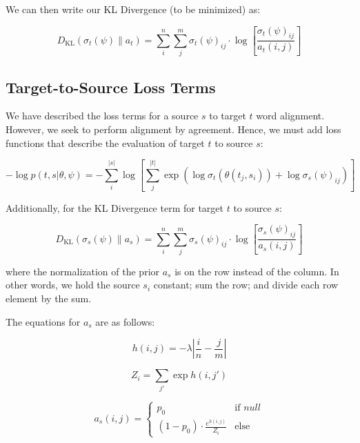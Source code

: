 \documentclass[twoside,twocolumn]{article}
\newlength\mystoreparindent
\newenvironment{myparindent}[1]{%
  \setlength{\mystoreparindent}{\the\parindent}
  \setlength{\parindent}{#1}
  }{%
  \setlength{\parindent}{\mystoreparindent}
}
\begin{document}
\begin{myparindent}{0pt}
We can then write our KL Divergence (to be minimized) as:

\begin{equation}
  D_{\mathrm{KL}}(\sigma_t(\psi) \| a_t) =
    \sum_i^n \sum_j^m \sigma_t(\psi)_{ij} \cdot
      \log \left[ \frac{\sigma_t(\psi)_{ij}}{a_t(i, j)} \right]
\end{equation}


\subsection{Target-to-Source Loss Terms}

We have described the loss terms for a source $s$ to target $t$ word alignment.
However, we seek to perform alignment by agreement. Hence, we must add loss
functions that describe the evaluation of target $t$ to source $s$:

\begin{equation}
  -\log  p(t , s | \theta, \psi) =
  - \sum_i^{|s|}  \log \left[ \sum_j^{|t|}
      \exp \left(
        \log \sigma_t(\theta(t_j, s_i)) + \log \sigma_s(\psi)_{ij}
      \right)
    \right]
\end{equation}

\noindent
Additionally, for the KL Divergence term for target $t$ to source $s$:

\begin{equation}
D_{\mathrm{KL}} (\sigma_s(\psi) \| a_s) = \sum_i^n \sum_j^m \sigma_s(\psi)_{ij}
  \cdot \log \left[ \frac{\sigma_s(\psi)_{ij}}{a_s(i, j)} \right]
\end{equation}

\noindent
where the normalization of the prior $a_s$ is on the row instead of the column.
In other words, we hold the source $s_i$ constant; sum the row; and divide each
row element by the sum.

The equations for $a_s$ are as follows:

\begin{equation}
  h(i, j) = {-\lambda \left| \frac{i}{n} - \frac{j}{m}\right|}
\end{equation}

\begin{equation}
  Z_i = \sum_{j'} \exp h(i, j')
\end{equation}

\begin{equation}
a_s (i, j) =
\begin{cases}
      p_0 & \text{if } null \\
     (1-p_0) \cdot \frac{e^{h(i,j)}}{Z_i} & \text{else}
   \end{cases}
\end{equation}


\end{myparindent}
\end{document}
